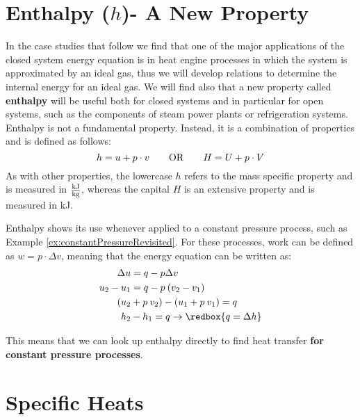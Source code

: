 \section{Enthalpy ($h$)- A New Property} \label{sec:ch3_enthalpy}

In the case studies that follow we find that one of the major applications of the closed system energy equation is in heat engine processes in which the system is approximated by an ideal gas, thus we will develop relations to determine the internal energy for an ideal gas. We will find also that a new property called {\bf enthalpy} will be useful both for closed systems and in particular for open systems, such as the components of steam power plants or refrigeration systems. Enthalpy is not a fundamental property. Instead, it is a combination of properties and is defined as follows:
\begin{equation}
  h = u + p\cdot v\quad \quad {\rm OR} \quad \quad H = U + p\cdot V
\end{equation}
As with other properties, the lowercase $h$ refers to the mass specific property and is measured in $\frac{\rm kJ}{\rm kg}$, whereas the capital $H$ is an extensive property and is measured in kJ.

Enthalpy shows its use whenever applied to a constant pressure process, such as Example \ref{ex:constantPressureRevisited}.  For these processes, work can be defined as $w = p\cdot \Delta v$, meaning that the energy equation can be written as:
\begin{align*}
  \Delta u &= q - p \Delta v\\
  u_2 - u_1 &= q - p\: (v_2 - v_1)\\
  (u_2 &+ p\: v_2) - (u_1 + p\: v_1) = q \\
  h_2 &- h_1 = q \rightarrow \redbox{q = \Delta h}
\end{align*}

This means that we can look up enthalpy directly to find heat transfer {\bf for constant pressure processes}.

\section{Specific Heats} \label{sec:specificHeats}

